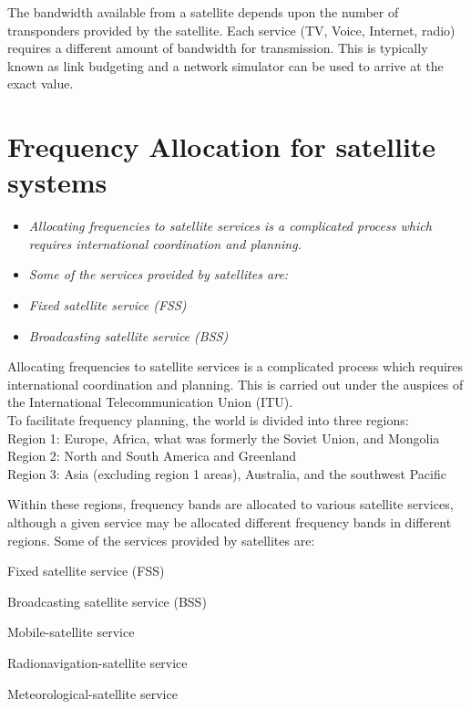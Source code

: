 The bandwidth available from a satellite depends upon the number of
transponders provided by the satellite. Each service (TV, Voice,
Internet, radio) requires a different amount of bandwidth for
transmission. This is typically known as link budgeting and a network
simulator can be used to arrive at the exact value.

\section{Frequency Allocation for satellite
systems}\label{frequency-allocation-for-satellite-systems}

\begin{itemize}
\item
  \emph{Allocating frequencies to satellite services is a complicated
  process which requires international coordination and planning.}
\item
  \emph{Some of the services provided by satellites are:}
\item
  \emph{Fixed satellite service (FSS)}
\item
  \emph{Broadcasting satellite service (BSS)}
\end{itemize}

Allocating frequencies to satellite services is a complicated process
which requires international coordination and planning. This is carried
out under the auspices of the International Telecommunication Union
(ITU).\\
To facilitate frequency planning, the world is divided into three
regions:\\
Region 1: Europe, Africa, what was formerly the Soviet Union, and
Mongolia\\
Region 2: North and South America and Greenland\\
Region 3: Asia (excluding region 1 areas), Australia, and the southwest
Pacific

Within these regions, frequency bands are allocated to various satellite
services, although a given service may be allocated different frequency
bands in different regions. Some of the services provided by satellites
are:

Fixed satellite service (FSS)

Broadcasting satellite service (BSS)

Mobile-satellite service

Radionavigation-satellite service

Meteorological-satellite service

